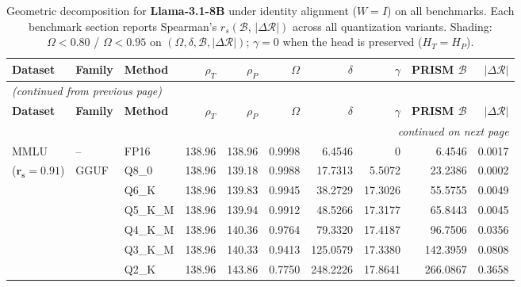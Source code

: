 \begingroup
\small
\setlength{\tabcolsep}{4pt}
\renewcommand{\arraystretch}{1.05}
\setlength{\LTcapwidth}{\textwidth}
\begin{longtable}{ll l rrrrrrr}
\caption{Geometric decomposition for \textbf{Llama-3.1-8B} under identity alignment ($W{=}I$) on all benchmarks. Each benchmark section reports Spearman's $r_s(\mathcal{B},\,|\Delta\mathcal{R}|)$ across all quantization variants. Shading: \colorbox{red!35}{$\Omega{<}0.80$} / \colorbox{red!18}{$\Omega{<}0.95$} on $(\Omega,\delta,\mathcal{B},|\Delta\mathcal{R}|)$; \colorbox{cyan!12}{$\gamma{=}0$} when the head is preserved ($H_T{=}H_P$).}\label{tab:llama_decomposition_all_bound}\\
\toprule
\textbf{Dataset} & \textbf{Family} & \textbf{Method} & \textbf{$\rho_T$} & \textbf{$\rho_P$} & \textbf{$\Omega$} & \textbf{$\delta$} & \textbf{$\gamma$} & \textbf{PRISM $\mathcal{B}$} & \textbf{$|\Delta\mathcal{R}|$} \\
\midrule
\endfirsthead
\multicolumn{10}{l}{\small\itshape (continued from previous page)}\\
\toprule
\textbf{Dataset} & \textbf{Family} & \textbf{Method} & \textbf{$\rho_T$} & \textbf{$\rho_P$} & \textbf{$\Omega$} & \textbf{$\delta$} & \textbf{$\gamma$} & \textbf{PRISM $\mathcal{B}$} & \textbf{$|\Delta\mathcal{R}|$} \\
\midrule
\endhead
\midrule
\multicolumn{10}{r}{\small\itshape continued on next page}\\
\endfoot
\bottomrule
\endlastfoot
MMLU & -- & FP16 & 138.96 & 138.96 & 0.9998 & 6.4546 & \cellcolor{cyan!12} $0$ & 6.4546 & 0.0017 \\
{\small ($\mathbf{r_s{=}0.91}$)} & GGUF & Q8\_0 & 138.96 & 139.18 & 0.9988 & 17.7313 & 5.5072 & 23.2386 & 0.0002 \\
 &  & Q6\_K & 138.96 & 139.83 & 0.9945 & 38.2729 & 17.3026 & 55.5755 & 0.0049 \\
 &  & Q5\_K\_M & 138.96 & 139.94 & 0.9912 & 48.5266 & 17.3177 & 65.8443 & 0.0045 \\
 &  & Q4\_K\_M & 138.96 & 140.36 & 0.9764 & 79.3320 & 17.4187 & 96.7506 & 0.0356 \\
 &  & Q3\_K\_M & 138.96 & 140.33 & \cellcolor{red!18} 0.9413 & \cellcolor{red!18} 125.0579 & 17.3380 & \cellcolor{red!18} 142.3959 & \cellcolor{red!18} 0.0808 \\
 &  & Q2\_K & 138.96 & 143.86 & \cellcolor{red!35} 0.7750 & \cellcolor{red!35} 248.2226 & 17.8641 & \cellcolor{red!35} 266.0867 & \cellcolor{red!35} 0.3658 \\

\end{longtable}
